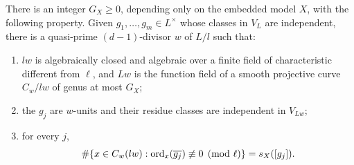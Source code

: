 \begin{proposition}\label{prop:finite-curve-test}
There is an integer $G_X\ge0$, depending only on the embedded model $X$,
with the following property.  Given $g_1,\ldots,g_m\in L^\times$ whose
classes in $V_L$ are independent, there is a quasi-prime
$(d-1)$-divisor $w$ of $L/l$ such that:
\begin{enumerate}
\item $lw$ is algebraically closed and algebraic over a finite field of
characteristic different from $\ell$, and $Lw$ is the function field of a
smooth projective curve $C_w/lw$ of genus at most $G_X$;
\item the $g_j$ are $w$-units and their residue classes are independent
in $V_{Lw}$;
\item for every $j$,
\[
 \#\{x\in C_w(lw):\operatorname{ord}_x(\overline{g_j})\not\equiv0\pmod\ell\}
       =s_X([g_j]).
\]
\end{enumerate}
\end{proposition}

